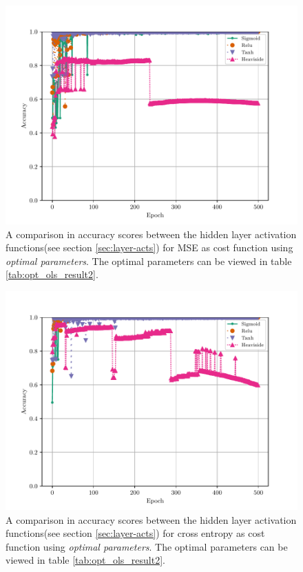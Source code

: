 \begin{figure}[H]
    \centering
    \includegraphics[scale=1.0]{../fig/mlp_epoch_activations_mse_optimal3.pdf}
    \caption{A comparison in accuracy scores between the hidden layer activation functions(see section \ref{sec:layer-acts}) for MSE as cost function using \textit{optimal parameters}. The optimal parameters can be viewed in table \ref{tab:opt_ols_result2}.}
    \label{fig:mlp-epoch-activations-mse-optimal}
\end{figure}

\begin{figure}[H]
    \centering
    \includegraphics[scale=1.0]{../fig/mlp_epoch_activations_log_loss_optimal3.pdf}
    \caption{A comparison in accuracy scores between the hidden layer activation functions(see section \ref{sec:layer-acts}) for cross entropy as cost function using \textit{optimal parameters}. The optimal parameters can be viewed in table \ref{tab:opt_ols_result2}.}
    \label{fig:mlp-epoch-activations-log-loss-optimal}
\end{figure}